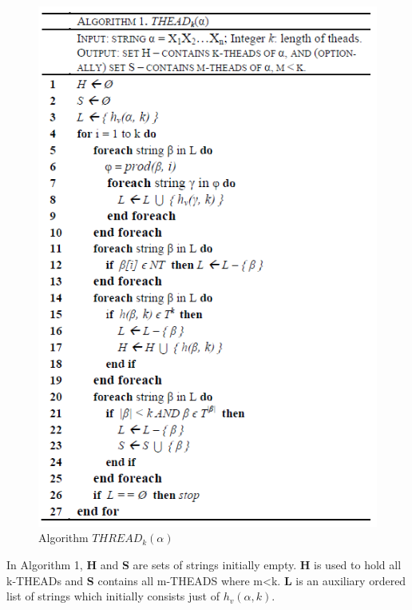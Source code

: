 \documentclass{sig-alternate-05-2015}
\begin{document}
\begin{figure}
\centering
\includegraphics[scale=0.65]{thead_algorithm.PNG}
\caption{Algorithm $THREAD_k(\alpha)$}
\label{fig:thead:algorithm}
\end{figure}

\bigskip
In Algorithm 1, \textbf{H} and \textbf{S} are sets of strings initially empty.
\textbf{H} is used to hold all k-THEADs and \textbf{S} contains all m-THEADS where m<k.
\textbf{L} is an auxiliary ordered list of strings which initially
consists just of $h_v(\alpha, k)$.
\bigskip
\end{document}
